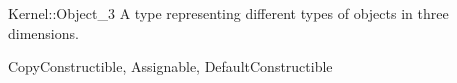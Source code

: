 \begin{ccRefConcept}{Kernel::Object_3}
A type representing different types of objects in three dimensions.

\ccRefines
CopyConstructible, Assignable, DefaultConstructible 

\ccSeeAlso
{} \\
 \\
 \\
 \\

\end{ccRefConcept}
